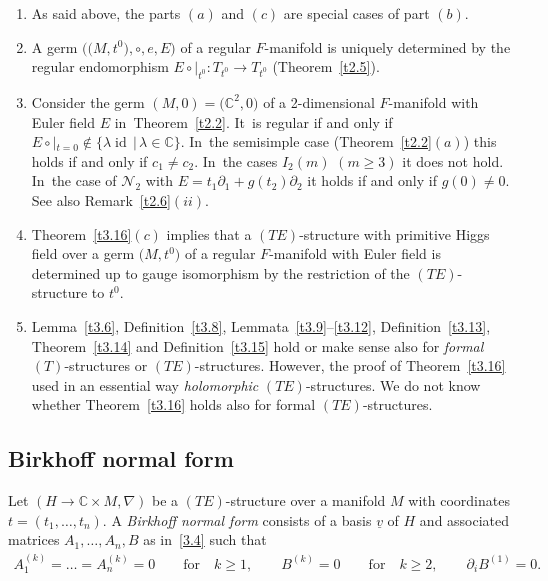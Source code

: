 \documentclass[pdftex]{sigma}%
\numberwithin{equation}{section}
\numberwithin{figure}{section}
\newcommand{\C}{{\mathbb C}}
\newcommand{\NN}{{\mathcal N}}
\newcommand{\uuuu}{\underline}
\newcommand{\paa}{\partial}
\newcommand{\nnn}{\nabla}
\DeclareMathOperator{\id}{id}
\begin{document}
\begin{Remarks}\label{t3.17}\qquad
\begin{enumerate}\itemsep=0pt
\item[$(i)$] As said above, the parts $(a)$ and $(c)$ are special cases
of part $(b)$.

\item[$(ii)$] A germ $\big(\big(M,t^0\big),\circ,e,E\big)$ of a regular $F$-manifold
is uniquely determined by the regular endomorphism
$E\circ|_{t^0}\colon T_{t^0}\to T_{t^0}$ (Theorem~\ref{t2.5}).

\item[$(iii)$] Consider the germ $(M,0)=\big(\C^2,0\big)$ of a 2-dimensional
$F$-manifold with Euler field $E$ in~Theorem~\ref{t2.2}. It~is regular if and only if
$E\circ|_{t=0}\notin\{\lambda\id\,|\, \lambda\in\C\}$. In~the semisimple case (Theorem~\ref{t2.2}$(a)$) this
holds if and only if $c_1\neq c_2$. In~the cases $I_2(m)$ $(m\geq 3)$ it does not hold. In~the case of $\NN_2$ with $E=t_1\paa_1+g(t_2)\paa_2$
it holds if and only if $g(0)\neq 0$.
See also Remark~\ref{t2.6}$(ii)$.

\item[$(iv)$] Theorem~\ref{t3.16}$(c)$ implies that a $(TE)$-structure
with primitive Higgs field
over a germ $\big(M,t^0\big)$ of a regular $F$-manifold with
Euler field is determined up to gauge isomorphism
by the restriction of the $(TE)$-structure to $t^0$.

\item[$(v)$] Lemma~\ref{t3.6}, Definition~\ref{t3.8},
Lemmata~\ref{t3.9}--\ref{t3.12}, Definition~\ref{t3.13},
Theorem~\ref{t3.14} and Definition~\ref{t3.15}
hold or make sense also for {\it formal} $(T)$-structures
or $(TE)$-structures. However, the proof of Theorem~\ref{t3.16}
used in an essential way {\it holomorphic} $(TE)$-structures.
We do not know whether Theorem~\ref{t3.16}
holds also for formal $(TE)$-structures.
\end{enumerate}
\end{Remarks}





\subsection{Birkhoff normal form}%


\begin{Definition}\label{t3.18}
Let $(H\to\C\times M,\nnn)$ be a $(TE)$-structure
over a manifold $M$ with coordinates $t=(t_1,\dots ,t_n)$.
A {\it Birkhoff normal form} consists of a basis
$\uuuu{v}$ of $H$ and associated matrices
$A_1,\dots ,A_n,B$ as in~\eqref{3.4} such that
\begin{gather*}%
A_1^{(k)}=\dots =A_n^{(k)}=0\qquad \text{for}\quad k\geq 1,\qquad
B^{(k)}=0\qquad\text{for}\quad k\geq 2,\qquad
\paa_i B^{(1)}=0.
\end{gather*}
\end{Definition}
\end{document}
